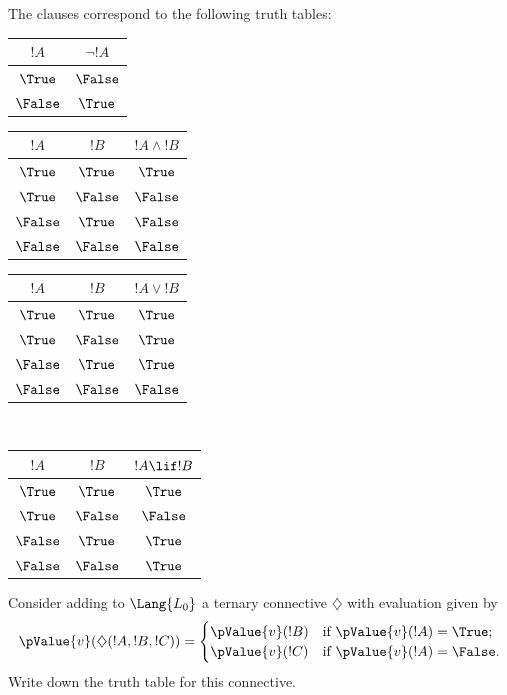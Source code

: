\begin{explain}
The clauses correspond to the following truth tables:
\begin{center}

  \begin{tabular}{|c||c|} \hline
    $!A$ & $ \lnot !A$ \\
    \hline \hline
    $\True$ & $\False$ \\
    $\False$ & $\True$ \\
    \hline
  \end{tabular}


  \begin{tabular}{|cc||c|} \hline
    $!A$ & $!B$ & $!A \land !B$ \\
    \hline \hline
    $\True$ & $\True$ & $\True$ \\
    $\True$ & $\False$ & $\False$ \\
    $\False$ & $\True$ & $\False$ \\
    $\False$ & $\False$ & $\False$ \\
    \hline
  \end{tabular}


  \begin{tabular}{|cc||c|} \hline
    $!A$ & $!B$ & $!A \lor !B$ \\
    \hline \hline
    $\True$ & $\True$ & $\True$ \\
    $\True$ & $\False$ & $\True$ \\
    $\False$ & $\True$ & $\True$ \\
    $\False$ & $\False$ & $\False$ \\
    \hline
  \end{tabular}

\\[1em]

  \begin{tabular}{|cc||c|} \hline
    $!A$ & $!B$ & $!A \lif !B$ \\
    \hline \hline
    $\True$ & $\True$ & $\True$ \\
    $\True$ & $\False$ & $\False$ \\
    $\False$ & $\True$ & $\True$ \\
    $\False$ & $\False$ & $\True$ \\
    \hline
  \end{tabular}


\end{center}
\end{explain}

\begin{prob}
Consider adding to $\Lang{L_0}$ a ternary connective $\diamondsuit$
with evaluation given by
\begin{gather*}
  \pValue{v}(\diamondsuit( !A , !B , !C ) ) = \begin{cases}
    \pValue{v}( !B ) &
    \text{if $\pValue{v}(!A) = \True$;}\\
    \pValue{v}( !C ) &
    \text{if $\pValue{v}(!A) = \False $}.
  \end{cases}
\end{gather*}
Write down the truth table for this connective.
\end{prob}

